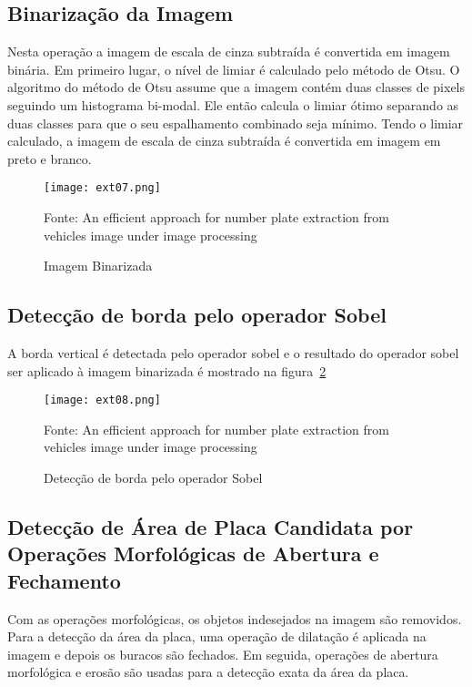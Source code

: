 \subsection{Binarização da Imagem}

Nesta operação a imagem de escala de cinza subtraída é convertida em imagem
binária. Em primeiro lugar, o nível de limiar é calculado pelo método de Otsu.
O algoritmo do método de Otsu assume que  a imagem contém duas classes de pixels
seguindo um histograma bi-modal. Ele então calcula o limiar ótimo separando as
duas classes para que o seu espalhamento combinado seja mínimo.
Tendo o limiar calculado, a imagem de escala de cinza subtraída é convertida em
imagem em preto e branco.

\begin{figure}[H]
	\centering
	\texttt{[image: ext07.png]}
	\caption{Imagem Binarizada}
Fonte: An efficient approach for number plate extraction from vehicles image under image processing~\cite{kaur2014efficient}
	\label{fig:ext_binarized_image}
\end{figure}

\subsection{Detecção de borda pelo operador Sobel}

A borda vertical é detectada pelo operador sobel e o resultado do operador sobel
ser aplicado à imagem binarizada é mostrado na figura~\ref{fig:ext_edge_detection_sobel}

\begin{figure}[H]
	\centering
	\texttt{[image: ext08.png]}
	\caption{Detecção de borda pelo operador Sobel}
Fonte: An efficient approach for number plate extraction from vehicles image under image processing~\cite{kaur2014efficient}
	\label{fig:ext_edge_detection_sobel}
\end{figure}

\subsection{Detecção de Área de Placa Candidata por Operações Morfológicas de Abertura e Fechamento}

Com as operações morfológicas, os objetos indesejados na imagem são removidos.
Para a detecção da área da placa, uma operação de dilatação é aplicada na imagem
e depois os buracos são fechados. Em seguida, operações de abertura morfológica
e erosão são usadas para a detecção exata da área da placa.

